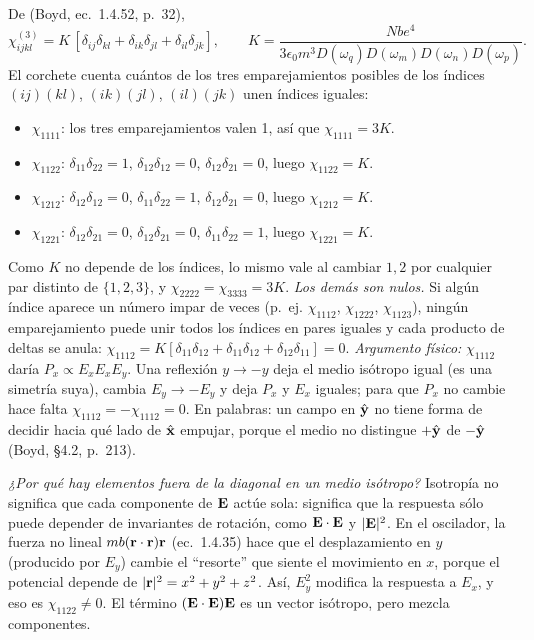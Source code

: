 \label{sol:33}

 De (Boyd, ec.~1.4.52, p.~32),
\[
\chi^{(3)}_{ijkl}=K\,[\delta_{ij}\delta_{kl}+\delta_{ik}\delta_{jl}+\delta_{il}\delta_{jk}],\qquad K=\frac{Nbe^4}{3\epsilon_0m^3D(\omega_q)D(\omega_m)D(\omega_n)D(\omega_p)}.
\]
El corchete cuenta cuántos de los tres emparejamientos posibles de los índices $(ij)(kl)$, $(ik)(jl)$, $(il)(jk)$ unen índices iguales:
\begin{itemize}
\item $\chi_{1111}$: los tres emparejamientos valen 1, así que $\chi_{1111}=3K$.
\item $\chi_{1122}$: $\delta_{11}\delta_{22}=1$, $\delta_{12}\delta_{12}=0$, $\delta_{12}\delta_{21}=0$, luego $\chi_{1122}=K$.
\item $\chi_{1212}$: $\delta_{12}\delta_{12}=0$, $\delta_{11}\delta_{22}=1$, $\delta_{12}\delta_{21}=0$, luego $\chi_{1212}=K$.
\item $\chi_{1221}$: $\delta_{12}\delta_{21}=0$, $\delta_{12}\delta_{21}=0$, $\delta_{11}\delta_{22}=1$, luego $\chi_{1221}=K$.
\end{itemize}
Como $K$ no depende de los índices, lo mismo vale al cambiar $1,2$ por cualquier par distinto de $\{1,2,3\}$, y $\chi_{2222}=\chi_{3333}=3K$.
\emph{Los demás son nulos.} Si algún índice aparece un número impar de veces (p.~ej. $\chi_{1112}$, $\chi_{1222}$, $\chi_{1123}$), ningún emparejamiento puede unir todos los índices en pares iguales y cada producto de deltas se anula: $\chi_{1112}=K[\delta_{11}\delta_{12}+\delta_{11}\delta_{12}+\delta_{12}\delta_{11}]=0$. \emph{Argumento físico:} $\chi_{1112}$ daría $P_x\propto E_xE_xE_y$. Una reflexión $y\to-y$ deja el medio isótropo igual (es una simetría suya), cambia $E_y\to-E_y$ y deja $P_x$ y $E_x$ iguales; para que $P_x$ no cambie hace falta $\chi_{1112}=-\chi_{1112}=0$. En palabras: un campo en $\hat{\mathbf y}$ no tiene forma de decidir hacia qué lado de $\hat{\mathbf x}$ empujar, porque el medio no distingue $+\hat{\mathbf y}$ de $-\hat{\mathbf y}$ (Boyd, §4.2, p.~213).

\emph{¿Por qué hay elementos fuera de la diagonal en un medio isótropo?} Isotropía no significa que cada componente de $\mathbf E$ actúe sola: significa que la respuesta sólo puede depender de invariantes de rotación, como $\mathbf E\cdot\mathbf E$ y $|\mathbf E|^2$. En el oscilador, la fuerza no lineal $mb(\mathbf r\cdot\mathbf r)\mathbf r$ (ec.~1.4.35) hace que el desplazamiento en $y$ (producido por $E_y$) cambie el ``resorte'' que siente el movimiento en $x$, porque el potencial depende de $|\mathbf r|^2=x^2+y^2+z^2$. Así, $E_y^2$ modifica la respuesta a $E_x$, y eso es $\chi_{1122}\neq0$. El término $(\mathbf E\cdot\mathbf E)\mathbf E$ es un vector isótropo, pero mezcla componentes.

